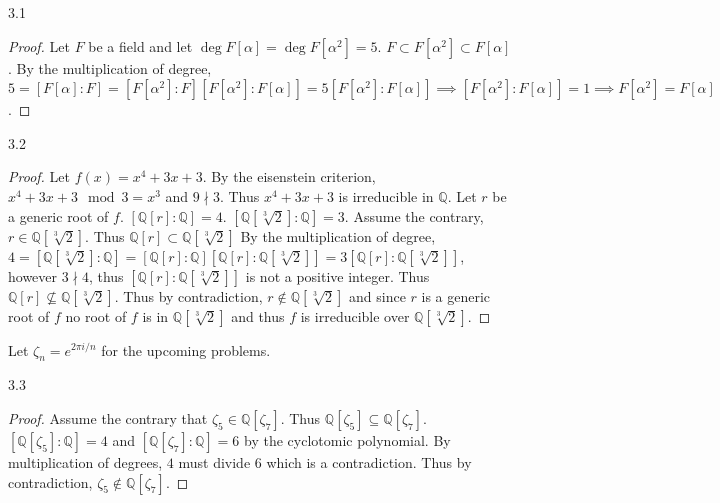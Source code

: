 \documentclass{article}
\newcommand{\Q}{\mathbb{Q}}
\begin{document}
\begin{PROB}{3.1}\label{Problem 3.1.}
\end{PROB}
\begin{proof}
    Let $F$ be a field and let $\deg F[\alpha] = \deg F[\alpha^2] = 5$. $F \subset F[\alpha^2] \subset F[\alpha]$. By the multiplication of degree, $5 = [F[\alpha] : F] = [F[\alpha^2] : F][F[\alpha^2] : F[\alpha]] = 5[F[\alpha^2] : F[\alpha]] \implies [F[\alpha^2] : F[\alpha]] = 1 \implies F[\alpha^2] = F[\alpha]$.     
\end{proof}

\bigskip

\begin{PROB}{3.2}\label{Problem 3.2.}
\end{PROB}
\begin{proof}
    Let $f(x) = x^4 + 3x + 3$. 
    By the eisenstein criterion, $x^4 + 3x + 3 \mod 3 = x^3$ and $9 \nmid 3$. Thus $x^4 + 3x + 3$ is irreducible in $\Q$. Let $r$ be a generic root of $f$. $[\Q[r] : \Q] = 4$. $[\Q[\sqrt[3]{2}] : \Q] = 3$. Assume the contrary, $r \in \Q[\sqrt[3]{2}]$. Thus $\Q[r] \subset \Q[\sqrt[3]{2}]$  By the multiplication of degree, $4 = [\Q[\sqrt[3]{2}] : \Q] = [\Q[r] : \Q][\Q[r] : \Q[\sqrt[3]{2}]] = 3[\Q[r] : \Q[\sqrt[3]{2}]]$, however $3 \nmid 4$, thus $[\Q[r] : \Q[\sqrt[3]{2}]]$ is not a positive integer. Thus $\Q[r] \not \subseteq \Q[\sqrt[3]{2}]$. Thus by contradiction, $r \not \in \Q[\sqrt[3]{2}]$ and since $r$ is a generic root of $f$ no root of $f$ is in $\Q[\sqrt[3]{2}]$ and thus $f$ is irreducible over $\Q[\sqrt[3]{2}]$.  
\end{proof}

\bigskip

Let $\zeta_n = e^{2 \pi i / n}$ for the upcoming problems. 

\begin{PROB}{3.3}\label{Problem 3.3.}
\end{PROB}
\begin{proof}
    Assume the contrary that $\zeta_5 \in \Q[\zeta_7]$. Thus $\Q[\zeta_5] \subseteq \Q[\zeta_7]$. $[\Q[\zeta_5] : \Q] = 4$ and $[\Q[\zeta_7] : \Q] = 6$ by the cyclotomic polynomial. By multiplication of degrees, $4$ must divide 6 which is a contradiction. Thus by contradiction, $\zeta_5 \not \in \Q[\zeta_7]$.      
\end{proof}

\bigskip
\end{document}

